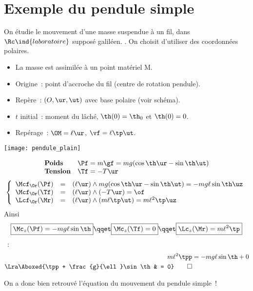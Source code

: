 \documentclass[../../main/main.tex]{subfiles}
\begin{document}
\section{Exemple du pendule simple}
\hspace*{-0.75cm}
\begin{minipage}{0.70\linewidth}
	\begin{enumerate}[label=\sqenumi]
		 On étudie le mouvement d'une masse
		suspendue à un fil, dans $\Rc\ind{laboratoire}$ supposé galiléen.
		.
		 On choisit d'utiliser des coordonnées polaires.
		\begin{itemize}
			\item La masse est assimilée à un point matériel M.
			\item Origine~: point d'accroche du fil (centre de rotation
			      pendule).
			\item Repère~: $(O,\ur,\ut)$ avec base polaire (voir schéma).
			\item $t$ initial~: moment du lâché, $\th(0) = \th_0$ et
			      $\th(0) = 0$.
			\item Repérage~: $\OM = \ell\ur$, $\vf = \ell\tp\ut$.
		\end{itemize}
	\end{enumerate}
\end{minipage}
\hfill
\begin{minipage}{0.25\linewidth}
	\begin{center}
		\texttt{[image: pendule\_plain]}
	\end{center}
\end{minipage}
\begin{enumerate}[label=\sqenumi, start=4]
	\[
		\begin{array}{ll}
			\textbf{Poids}   & \Pf = m\gf = mg(\cos\th \ur - \sin\th \ut) \\
			\textbf{Tension} & \Tf = -T\ur
		\end{array}
	\]
	\[
		\left\{
		\begin{array}{rcl}
			\Mcf_{\Or}(\Pf) & = & (\ell\ur)\wedge mg(\cos\th \ur - \sin\th \ut)
			= -mg\ell\sin\th\uz                                                 \\
			\Mcf_{\Or}(\Tf) & = & (\ell\ur)\wedge(-T\ur) = \of                  \\
			\Lcf_{\Or}(\Mr) & = & (\ell\ur)\wedge(m\ell\tp\ut) =
			m\ell^2\tp\uz
		\end{array}
		\right.
	\]
	Ainsi
	\[
		\boxed{\Mc_z(\Pf) = -mg\ell\sin\th}
		\qqet
		\boxed{\Mc_z(\Tf) = 0}
		\qqet
		\boxed{\Lc_z(\Mr) = m\ell^2\tp}
	\]
	~:
	\begin{align*}
		m\ell^2\tpp                          & = -mg\ell\sin\th + 0
		\\\Lra
		\Aboxed{\tpp + \frac{g}{\ell}\sin\th & = 0}
		\qed
	\end{align*}
\end{enumerate}
On a donc bien retrouvé l'équation du mouvement du pendule simple~!
\end{document}
